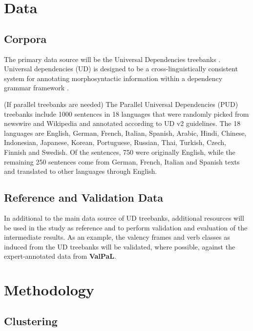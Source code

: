 \section{Data}

\subsection{Corpora}

The primary data source will be the Universal Dependencies treebanks \citep{universaldep}. Universal dependencies (UD) is designed to be a cross-linguistically consistent system for annotating morphosyntactic information within a dependency grammar framework \citep{demarneffe2021}. 

(If parallel treebanks are needed) The Parallel Universal Dependencies (PUD) treebanks \citep{zeman2017} include 1000 sentences in 18 languages that were randomly picked from newswire and Wikipedia and annotated according to UD v2 guidelines. The 18 languages are English, German, French, Italian, Spanish, Arabic, Hindi, Chinese, Indonesian, Japanese, Korean, Portuguese, Russian, Thai, Turkish, Czech, Finnish and Swedish. Of the sentences, 750 were originally English, while the remaining 250 sentences come from German, French, Italian and Spanish texts and translated to other languages through English.

\subsection{Reference and Validation Data}

In additional to the main data source of UD treebanks, additional resources will be used in the study as reference and to perform validation and evaluation of the intermediate results. As an example, the valency frames and verb classes as induced from the UD treebanks will be validated, where possible, against the expert-annotated data from \textbf{ValPaL}\citep{valpal}. 

\section{Methodology}

\subsection{Clustering}

